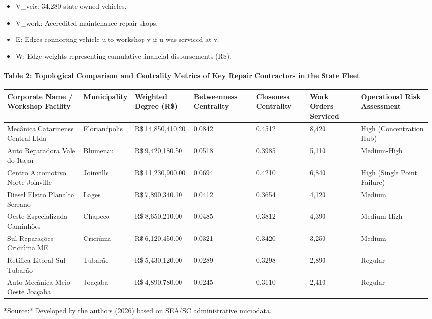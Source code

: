 \documentclass[10pt,a4paper,journal]{article}
\begin{document}
\begin{itemize}
\item V\_veic: 34,280 state-owned vehicles.
\end{itemize}
\begin{itemize}
\item V\_work: Accredited maintenance repair shops.
\end{itemize}
\begin{itemize}
\item E: Edges connecting vehicle u to workshop v if u was serviced at v.
\end{itemize}
\begin{itemize}
\item W: Edge weights representing cumulative financial disbursements (R\$).
\end{itemize}
\paragraph{Table 2: Topological Comparison and Centrality Metrics of Key Repair Contractors in the State Fleet}
\begin{table}[htbp]
\centering
\small
\begin{tabular}{lllllll}
\toprule
Corporate Name / Workshop Facility & Municipality & Weighted Degree (R\$) & Betweenness Centrality & Closeness Centrality & Work Orders Serviced & Operational Risk Assessment \\
\midrule
Mecânica Catarinense Central Ltda & Florianópolis & R\$ 14,850,410.20 & 0.0842 & 0.4512 & 8,420 & High (Concentration Hub) \\
Auto Reparadora Vale do Itajaí & Blumenau & R\$ 9,420,180.50 & 0.0518 & 0.3985 & 5,110 & Medium-High \\
Centro Automotivo Norte Joinville & Joinville & R\$ 11,230,900.00 & 0.0694 & 0.4210 & 6,840 & High (Single Point Failure) \\
Diesel Eletro Planalto Serrano & Lages & R\$ 7,890,340.10 & 0.0412 & 0.3654 & 4,120 & Medium \\
Oeste Especializada Caminhões & Chapecó & R\$ 8,650,210.00 & 0.0485 & 0.3812 & 4,390 & Medium-High \\
Sul Reparações Criciúma ME & Criciúma & R\$ 6,120,450.00 & 0.0321 & 0.3420 & 3,250 & Medium \\
Retífica Litoral Sul Tubarão & Tubarão & R\$ 5,430,120.00 & 0.0289 & 0.3298 & 2,890 & Regular \\
Auto Mecânica Meio-Oeste Joaçaba & Joaçaba & R\$ 4,890,780.00 & 0.0245 & 0.3110 & 2,410 & Regular \\
\bottomrule
\end{tabular}
\end{table}
*Source:* Developed by the authors (2026) based on SEA/SC administrative microdata.
\end{document}
